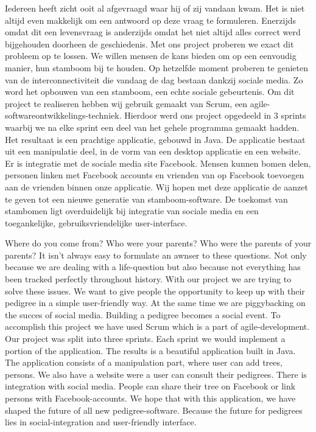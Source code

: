 \documentclass[pdftex,a4paper,12pt,twoside]{report}
\begin{document}
\abstract
Iedereen heeft zicht ooit al afgevraagd waar hij of zij vandaan kwam. Het is niet altijd even makkelijk om een antwoord op deze vraag te formuleren. Enerzijds omdat dit een levensvraag is anderzijds omdat het niet altijd alles correct werd bijgehouden doorheen de geschiedenis.  
Met ons project proberen we exact dit probleem op te lossen. We willen mensen de kans bieden om op een eenvoudig manier, hun stamboom bij te houden. Op hetzelfde moment proberen te genieten van de interconnectiviteit die vandaag de dag bestaan dankzij sociale media. Zo word het opbouwen van een stamboom, een echte sociale gebeurtenis. 
Om dit project te realiseren hebben wij gebruik gemaakt van Scrum, een agile-softwareontwikkelings-techniek. Hierdoor werd ons project opgedeeld in 3 sprints waarbij we na elke sprint een deel van het gehele programma gemaakt hadden.
Het resultaat is een prachtige applicatie, gebouwd in Java. De applicatie bestaat uit een manipulatie deel, in de vorm van een desktop applicatie en een website. Er is integratie met de sociale media site Facebook. Mensen kunnen bomen delen, personen linken met Facebook accounts en vrienden van op Facebook toevoegen aan de vrienden binnen onze applicatie.
Wij hopen met deze applicatie de aanzet te geven tot een nieuwe generatie van stamboom-software. De toekomst van stambomen ligt overduidelijk bij integratie van sociale media en een toegankelijke, gebruiksvriendelijke user-interface.

\abstract
Where do you come from? Who were your parents? Who were the parents of your parents? It isn't always easy to formulate an awnser to these questions. Not only because we are dealing with a life-question but also because not everything has been tracked perfectly throughout history. 
With our project we are trying to solve these issues. We want to give people the opportunity to keep up with their pedigree in a simple user-friendly way. At the same time we are piggybacking on the succes of social media. Building a pedigree becomes a social event.
To accomplish this project we have used Scrum which is a part of agile-development. Our project was split into three sprints. Each sprint we would implement a portion of the application. 
The results is a beautiful application built in Java. The application consists of a manipulation part, where user can add trees, persons. We also have a website were a user can consult their pedigrees. There is integration with social media. People can share their tree on Facebook or link persons with  Facebook-accounts. 
We hope that with this application, we have shaped the future of all new pedigree-software.
Because the future for pedigrees lies in social-integration and user-friendly interface. 
\end{document}
